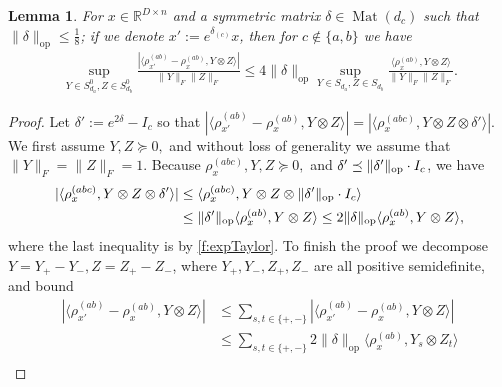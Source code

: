 \documentclass[aos]{imsart}
\newtheorem{lemma}[theorem]{Lemma}
\theoremstyle{definition}
\numberwithin{equation}{section}
\DeclareMathOperator{\op}{op}
\DeclareMathOperator{\Mat}{Mat}
\DeclarePairedDelimiter{\norm}{\lVert}{\rVert}
\newcommand{\R}{{\mathbb{R}}}
\newcommand{\smallSym}{S}
\newcommand{\samp}{x}
\begin{document}
\begin{appendix}
\begin{lemma} \label{ctoabRobustness}
For $\samp \in \R^{D \times n}$ and a symmetric matrix $\delta \in \Mat(d_{c})$ such that $\|\delta\|_{\op} \leq \frac{1}{8}$; if we denote $\samp' := e^{\delta_{(c)}}  \samp$, then for $c \not\in \{a,b\}$ we have
\begin{align*}\sup_{Y \in \smallSym_{d_{a}}^{0}, Z \in \smallSym_{d_{b}}^{0}} \frac{|\langle \rho_{\samp'}^{(ab)} - \rho_{\samp}^{(ab)}, Y \otimes Z \rangle|}{\|Y\|_{F} \|Z\|_{F}} \leq 4 \|\delta\|_{\op} \sup_{Y \in \smallSym_{d_{a}}, Z \in \smallSym_{d_{b}}} \frac{\langle \rho_{\samp}^{(ab)}, Y \otimes Z \rangle}{\|Y\|_{F} \|Z\|_{F}} .     \end{align*}
\end{lemma}
\begin{proof}
Let $\delta' := e^{2 \delta} - I_{c}$ so that $|\langle \rho_{\samp'}^{(ab)} - \rho_{\samp}^{(ab)}, Y \otimes Z \rangle| =  |\langle \rho_{\samp}^{(abc)}, Y \otimes Z \otimes \delta' \rangle|$.
We first assume $Y,Z \succeq 0, $ and without loss of generality we assume that $\|Y\|_{F} = \|Z\|_{F} = 1$. Because $\rho_{\samp}^{(abc)}, Y, Z \succeq 0,$ and $\delta' \preceq \norm{\delta'}_{\op} \cdot I_c$, we have
\begin{align*}
|\langle \rho_{\samp}^{(abc)}, Y \otimes Z \otimes \delta' \rangle|
& \leq \langle \rho_{\samp}^{(abc)}, Y \otimes Z \otimes \norm{\delta'}_{\op} \cdot I_c \rangle\\
& \leq \|\delta'\|_{\op} \langle \rho_{\samp}^{(ab)}, Y \otimes Z \rangle \leq 2 \|\delta\|_{\op} \langle \rho_{\samp}^{(ab)}, Y \otimes Z \rangle, \end{align*}
where the last inequality is by \cref{f:expTaylor}.
To finish the proof we decompose $Y = Y_{+} - Y_{-}, Z = Z_{+} - Z_{-}$, where $Y_+, Y_-, Z_+, Z_-$ are all positive semidefinite, and bound
\begin{align*} |\langle \rho_{\samp'}^{(ab)} - \rho_{\samp}^{(ab)}, Y \otimes Z \rangle|
& \leq \sum_{s,t \in \{+,-\}} |\langle \rho_{\samp'}^{(ab)} - \rho_{\samp}^{(ab)}, Y \otimes Z \rangle| \\
& \leq \sum_{s,t \in \{+,-\}} 2\|\delta\|_{\op} \langle \rho_{\samp}^{(ab)}, Y_s \otimes Z_t \rangle\\

\end{align*}
\end{proof}
\end{appendix}
\end{document}
